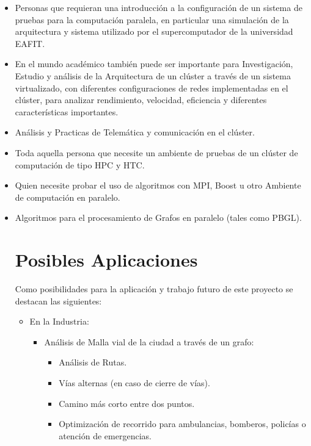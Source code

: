 \begin{itemize}
	
	\item Personas que requieran una introducción a la configuración de un sistema de pruebas para la computación paralela, en particular una simulación de la arquitectura y sistema utilizado por el supercomputador de la universidad EAFIT.

	\item En el mundo académico también puede ser importante para Investigación, Estudio y análisis de la Arquitectura de un clúster a través de un sistema virtualizado, con diferentes configuraciones de redes implementadas en el clúster, para analizar rendimiento, velocidad, eficiencia y diferentes características importantes. 


	\item Análisis y Practicas de Telemática y comunicación en el clúster. 

	\item Toda aquella persona que necesite un ambiente de pruebas de un clúster de computación  de tipo HPC y HTC.

	\item Quien necesite probar el uso de algoritmos con MPI, Boost u otro Ambiente de computación en paralelo.

	\item Algoritmos para el procesamiento de Grafos en paralelo (tales como PBGL).

	\newpage

	\section{Posibles Aplicaciones}

	Como posibilidades para la aplicación y trabajo futuro de este proyecto se destacan las siguientes: 

	\begin{itemize}
		\item En la Industria:

		\begin{itemize}
			\item Análisis de Malla vial de la ciudad a través de un grafo:
				\begin{itemize}
				 	\item Análisis de Rutas.
				 	\item Vías alternas (en caso de cierre de vías).
				 	\item Camino más corto entre dos puntos. 
				 	\item Optimización de recorrido para ambulancias, bomberos, policías o atención de emergencias. 
				 \end{itemize} 


\end{itemize}
\end{itemize}
\end{itemize}
